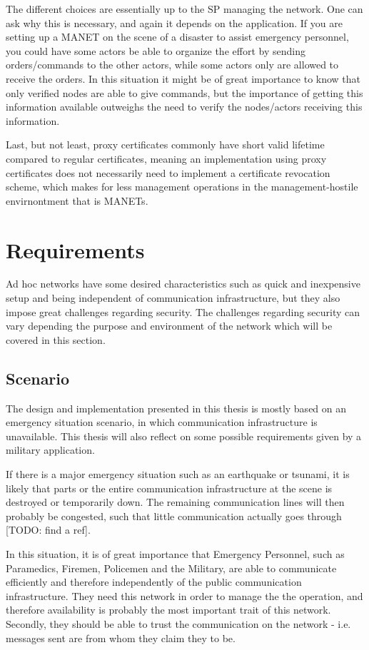The different choices are essentially up to the \ac{SP} managing the network.
One can ask why this is necessary, and again it depends on the application. If
you are setting up a \ac{MANET} on the scene of a disaster to assist emergency
personnel, you could have some actors be able to organize the effort by sending
orders/commands to the other actors, while some actors only are allowed to
receive the orders. In this situation it might be of great importance to know
that only verified nodes are able to give commands, but the importance of
getting this information available outweighs the need to verify the nodes/actors
receiving this information.

Last, but not least, proxy certificates commonly have short valid lifetime
compared to regular certificates, meaning an implementation using proxy
certificates does not necessarily need to implement a certificate revocation
scheme, which makes for less management operations in the management-hostile
envirnontment that is \acp{MANET}.


\section{Requirements}
Ad hoc networks have some desired characteristics such as quick and inexpensive
setup and being independent of communication infrastructure, but they also
impose great challenges regarding security. The challenges regarding security
can vary depending the purpose and environment of the network which will be
covered in this section.

\subsection{Scenario}
The design and implementation presented in this thesis is mostly based on an
emergency situation scenario, in which communication infrastructure is
unavailable. This thesis will also reflect on some possible requirements given
by a military application.

If there is a major emergency situation such as an earthquake or tsunami, it is
likely that parts or the entire communication infrastructure at the scene
is destroyed or temporarily down. The remaining communication lines will then
probably be congested, such that little communication actually goes through
[TODO: find a ref].

In this situation, it is of great importance that Emergency Personnel, such as
Paramedics, Firemen, Policemen and the Military, are able to communicate
efficiently and therefore independently of the public communication
infrastructure. They need this network in order to manage the the operation, and
therefore availability is probably the most important trait of this network.
Secondly, they should be able to trust the communication on the network - i.e.
messages sent are from whom they claim they to be.

